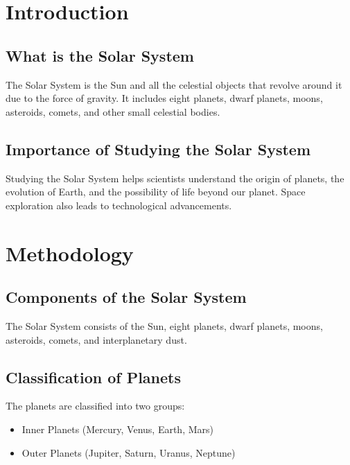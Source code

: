 \documentclass[12pt]{report}
\author{Anulekha}
\date{May 28, 2026}
\begin{document}
\maketitle
\tableofcontents


\chapter{Introduction}

\section{What is the Solar System}

The Solar System is the Sun and all the celestial objects that revolve around it due to the force of gravity. It includes eight planets, dwarf planets, moons, asteroids, comets, and other small celestial bodies.

\section{Importance of Studying the Solar System}

Studying the Solar System helps scientists understand the origin of planets, the evolution of Earth, and the possibility of life beyond our planet. Space exploration also leads to technological advancements.


\chapter{Methodology}

\section{Components of the Solar System}

The Solar System consists of the Sun, eight planets, dwarf planets, moons, asteroids, comets, and interplanetary dust.

\section{Classification of Planets}

The planets are classified into two groups:

\begin{itemize}
\item Inner Planets (Mercury, Venus, Earth, Mars)
\item Outer Planets (Jupiter, Saturn, Uranus, Neptune)
\end{itemize}
\end{document}
